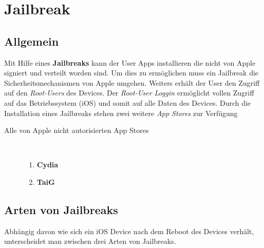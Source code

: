 %
%
% 
%
% 


\chapter{Jailbreak}
\label{ch:JB}

\section{Allgemein}
\label{sec:JBAllgemein}

Mit Hilfe eines \textbf{Jailbreaks} kann der User Apps installieren die nicht von Apple signiert und verteilt worden sind. Um dies zu ermöglichen muss ein Jailbreak die Sicherheitsmechanismen von Apple umgehen. Weiters erhält der User den Zugriff auf den \textit{\glqq Root-Users\grqq{}} des Devices. Der \textit{\glqq Root-User Loggin\grqq{}} ermöglicht vollen Zugriff auf das Betriebssystem (iOS) und somit auf alle Daten des Devices. Durch die Installation eines Jailbreaks stehen zwei weitere \textit{\glqq App Stores\grqq{}} zur Verfügung

\begin{description}
\item[Alle von Apple nicht autorisierten App Stores]~
	\begin{enumerate}
	   	\item \textbf{Cydia} \cite{Cydia[1]}
		\item \textbf{TaiG}
	\end{enumerate}
\end{description}

\section{Arten von Jailbreaks}
\label{sec:JBArten}
Abhängig davon wie sich ein iOS Device nach dem Reboot des Devices verhält, unterscheidet man zwischen drei Arten von Jailbreaks. 

